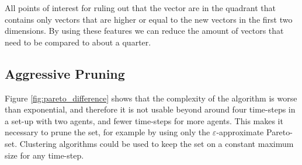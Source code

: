 \documentclass{article}
\begin{document}
		All points of interest for ruling out that the vector are in the quadrant
		that contains only vectors that are higher or equal to the new vectors in
		the first two dimensions. By using these features we can reduce the
		amount of vectors that need to be compared to about a quarter.




	\subsection{Aggressive Pruning}
		\label{sub:aggressive_pruning}
		Figure \ref{fig:pareto_difference} shows that the complexity of the
		algorithm is worse than exponential, and therefore it is not usable
		beyond around four time-steps in a set-up with two agents, and fewer
		time-steps for more agents. This makes it necessary to prune the set, for
		example by using only the $\varepsilon$-approximate Pareto-set.
		Clustering algorithms could be used to keep the set on a constant maximum
		size for any time-step.
	\pagebreak

	
	
\end{document}
